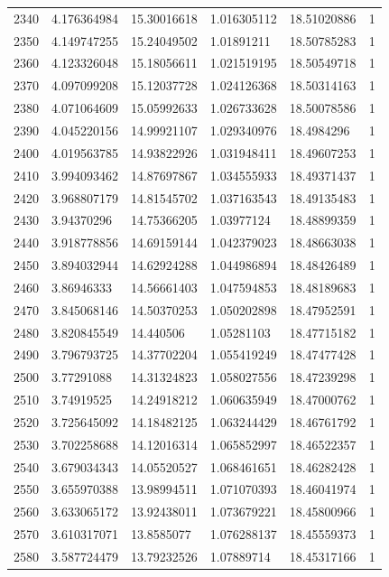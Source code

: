 \begin{longtable}{llllll}
2340 & 4.176364984 & 15.30016618 & 1.016305112 & 18.51020886 & 1 \\
2350 & 4.149747255 & 15.24049502 & 1.01891211 & 18.50785283 & 1 \\
2360 & 4.123326048 & 15.18056611 & 1.021519195 & 18.50549718 & 1 \\
2370 & 4.097099208 & 15.12037728 & 1.024126368 & 18.50314163 & 1 \\
2380 & 4.071064609 & 15.05992633 & 1.026733628 & 18.50078586 & 1 \\
2390 & 4.045220156 & 14.99921107 & 1.029340976 & 18.4984296 & 1 \\
2400 & 4.019563785 & 14.93822926 & 1.031948411 & 18.49607253 & 1 \\
2410 & 3.994093462 & 14.87697867 & 1.034555933 & 18.49371437 & 1 \\
2420 & 3.968807179 & 14.81545702 & 1.037163543 & 18.49135483 & 1 \\
2430 & 3.94370296 & 14.75366205 & 1.03977124 & 18.48899359 & 1 \\
2440 & 3.918778856 & 14.69159144 & 1.042379023 & 18.48663038 & 1 \\
2450 & 3.894032944 & 14.62924288 & 1.044986894 & 18.48426489 & 1 \\
2460 & 3.86946333 & 14.56661403 & 1.047594853 & 18.48189683 & 1 \\
2470 & 3.845068146 & 14.50370253 & 1.050202898 & 18.47952591 & 1 \\
2480 & 3.820845549 & 14.440506 & 1.05281103 & 18.47715182 & 1 \\
2490 & 3.796793725 & 14.37702204 & 1.055419249 & 18.47477428 & 1 \\
2500 & 3.77291088 & 14.31324823 & 1.058027556 & 18.47239298 & 1 \\
2510 & 3.74919525 & 14.24918212 & 1.060635949 & 18.47000762 & 1 \\
2520 & 3.725645092 & 14.18482125 & 1.063244429 & 18.46761792 & 1 \\
2530 & 3.702258688 & 14.12016314 & 1.065852997 & 18.46522357 & 1 \\
2540 & 3.679034343 & 14.05520527 & 1.068461651 & 18.46282428 & 1 \\
2550 & 3.655970388 & 13.98994511 & 1.071070393 & 18.46041974 & 1 \\
2560 & 3.633065172 & 13.92438011 & 1.073679221 & 18.45800966 & 1 \\
2570 & 3.610317071 & 13.8585077 & 1.076288137 & 18.45559373 & 1 \\
2580 & 3.587724479 & 13.79232526 & 1.07889714 & 18.45317166 & 1 \\

\end{longtable}

